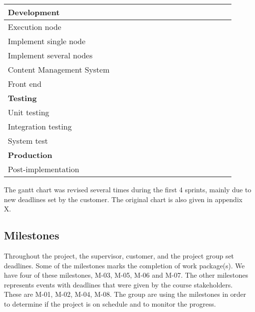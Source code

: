 \begin{table}
\begin{tabular}{|l|l|l|l|l|l|l|l|l|l|l|l|l|l|l|l|}
\hline
\textbf{Development}&&&&\cellcolor{Purple}&\cellcolor{Purple}&\cellcolor{Purple}&\cellcolor{Purple}&\cellcolor{Purple}&\cellcolor{Purple}&\cellcolor{Purple}&\cellcolor{Purple}&&&&  \\
\hline
Execution node&&&&&&&&\cellcolor{Orchid}&\cellcolor{Orchid}&\cellcolor{Orchid}&\cellcolor{Orchid}&&&&  \\
\hline
Implement single node&&&&&&&&\cellcolor{Thistle}&\cellcolor{Thistle}&\cellcolor{Thistle}&&&&&  \\
\hline
Implement several nodes&&&&&&&&&\cellcolor{Thistle}&\cellcolor{Thistle}&&&&&  \\
\hline
Content Management System&&&&&&&&&&&\cellcolor{Orchid}&&&&  \\
\hline
Front end&&&&\cellcolor{Orchid}&\cellcolor{Orchid}&\cellcolor{Orchid}&\cellcolor{Orchid}&\cellcolor{Orchid}&\cellcolor{Orchid}&\cellcolor{Orchid}&\cellcolor{Orchid}&&&&  \\
\hline
\textbf{Testing}&&&&&&&\rowcolor{Red}&\rowcolor{Red}&\rowcolor{Red}&\rowcolor{Red}&\rowcolor{Red}&\rowcolor{Red}&\rowcolor{Red}&\rowcolor{Red}&\rowcolor{Red}  \\
\hline
Unit testing &&&&&&&\rowcolor{Orchid}&\rowcolor{Orchid}&\rowcolor{Orchid}&\rowcolor{Orchid}&\rowcolor{Orchid}&\rowcolor{Orchid}&\rowcolor{Orchid}&\rowcolor{Orchid}&\rowcolor{Orchid}  \\
\hline
Integration testing&&&&&&&&&\rowcolor{Melon}&\rowcolor{Melon}&\rowcolor{Melon}&\rowcolor{Melon}&\rowcolor{Melon}&\rowcolor{Melon}&\rowcolor{Melon}  \\
\hline
System test&&&&&&&&&\rowcolor{Melon}&\rowcolor{Melon}&\rowcolor{Melon}&\rowcolor{Melon}&\rowcolor{Melon}&\rowcolor{Melon}&\rowcolor{Melon}  \\
\hline
\textbf{Production}&&&&&&&&&&&&&&\rowcolor{MidnightBlue}&\rowcolor{MidnightBlue}  \\
\hline
\hline
Post-implementation&&&&&&&&&&&&&&&\rowcolor{Plum} \\
\hline
\end{tabular}
\end{table}

The gantt chart was revised several times during the first 4 sprints,
mainly due to new deadlines set by the customer. The original chart is
also given in appendix X.

\subsection{Milestones}
Throughout the project, the supervisor, customer, and the project group
set deadlines.
Some of the milestones marks the completion of work package(s). We have
four of these milestones, M-03, M-05, M-06 and M-07. The other
milestones represents events with deadlines that were given by the
course stakeholders. These are M-01, M-02, M-04, M-08. The group are
using the milestones in order to determine if the project is on
schedule and to monitor the progress.

